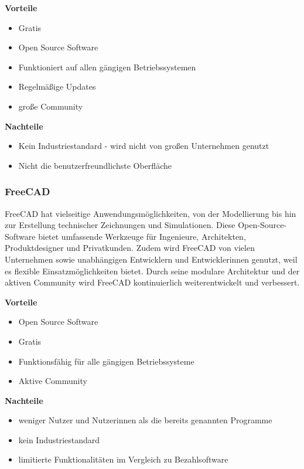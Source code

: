 \textbf{Vorteile}
\begin{itemize}
	\item Gratis 
	\item Open Source Software
	\item Funktioniert auf allen gängigen Betriebssystemen
	\item Regelmäßige Updates
	\item große Community
\end{itemize}

\textbf{Nachteile}
\begin{itemize}
	\item Kein Industriestandard - wird nicht von großen Unternehmen genutzt
	\item Nicht die benutzerfreundlichste Oberfläche
\end{itemize}
\textcite{BlenderProsUndCons}


\subsubsection{FreeCAD}
FreeCAD hat vielseitige Anwendungsmöglichkeiten, von der Modellierung bis hin zur Erstellung technischer Zeichnungen und Simulationen. Diese Open-Source-Software bietet umfassende Werkzeuge für Ingenieure, Architekten, Produktdesigner und Privatkunden. Zudem wird FreeCAD von vielen Unternehmen sowie unabhängigen Entwicklern und Entwicklerinnen genutzt, weil es flexible Einsatzmöglichkeiten bietet. Durch seine modulare Architektur und der aktiven Community wird FreeCAD kontinuierlich weiterentwickelt und verbessert. \\
\textcite{FreeCAD}  \textcite{FreeCAD2}

\textbf{Vorteile}
\begin{itemize}
	\item Open Source Software
	\item Gratis
	\item Funktionsfähig für alle gängigen Betriebssysteme
	\item Aktive Community	 
\end{itemize}

\textbf{Nachteile}
\begin{itemize}
	\item weniger Nutzer und Nutzerinnen als die bereits genannten Programme
	\item kein Industriestandard
	\item limitierte Funktionalitäten im Vergleich zu Bezahlsoftware
\end{itemize}
\textcite{FreeCADReviews}

